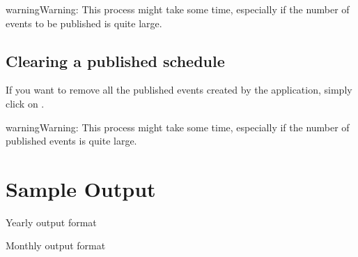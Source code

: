 \documentclass[letterpaper,10pt,english]{sphinxmanual}
\begin{document}
\begin{figure}[H]
\centering
{}\end{figure}

\begin{sphinxadmonition}{warning}{Warning:}
This process might take some time, especially if the number of events
to be published is quite large.
\end{sphinxadmonition}


\section{Clearing a published schedule}
\label{\detokenize{manual:clearing-a-published-schedule}}
If you want to remove all the published events created by the application,
simply click on .

\begin{figure}[H]
\centering
{}\end{figure}

\begin{sphinxadmonition}{warning}{Warning:}
This process might take some time, especially if the number of published
events is quite large.
\end{sphinxadmonition}


\chapter{Sample Output}
\label{\detokenize{manual:sample-output}}
Yearly output format

\begin{figure}[H]
\centering
{}\end{figure}

Monthly output format

\begin{figure}[H]
\centering
{}\end{figure}



\renewcommand{\indexname}{Index}
\printindex
\end{document}
